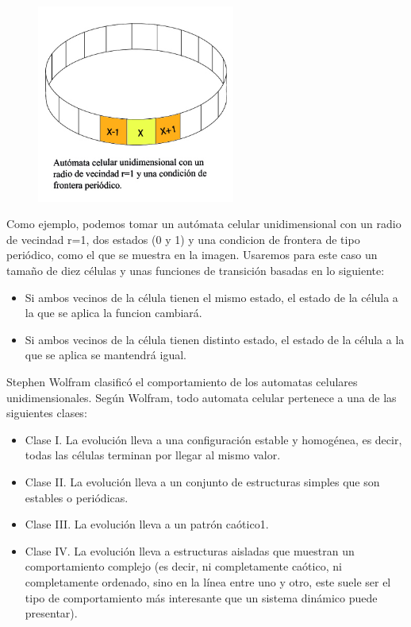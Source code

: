 \documentclass[11pt]{article}
\begin{document}
\begin{figure}[htp]
\centering
\includegraphics[width=6.5cm]{01.jpg}
\label{fig:lion}
\end{figure}

Como ejemplo, podemos tomar un autómata celular unidimensional con un radio de vecindad r=1, dos estados (0 y 1) y una condicion de frontera de tipo periódico, como el que se muestra en la imagen. Usaremos para este caso un tamaño de diez células y unas funciones de transición basadas en lo siguiente: 
\begin{itemize}
  \item Si ambos vecinos de la célula tienen el mismo estado, el estado de la célula a la que se aplica la funcion cambiará.
  \item Si ambos vecinos de la célula tienen distinto estado, el estado de la célula a la que se aplica se mantendrá igual.
\end{itemize}

\clearpage

Stephen Wolfram clasificó el comportamiento de los automatas celulares unidimensionales. Según Wolfram, todo automata celular pertenece a una de las siguientes clases:

\begin{itemize}
  \item Clase I. La evolución lleva a una configuración estable y homogénea, es decir, todas las células terminan por llegar al mismo valor.
  \item Clase II. La evolución lleva a un conjunto de estructuras simples que son estables o periódicas.
  \item Clase III. La evolución lleva a un patrón caótico1.
  \item Clase IV. La evolución lleva a estructuras aisladas que muestran un comportamiento complejo (es decir, ni completamente caótico, ni completamente ordenado, sino en la línea entre uno y otro, este suele ser el tipo de comportamiento más interesante que un sistema dinámico puede presentar).
\end{itemize}
\end{document}

